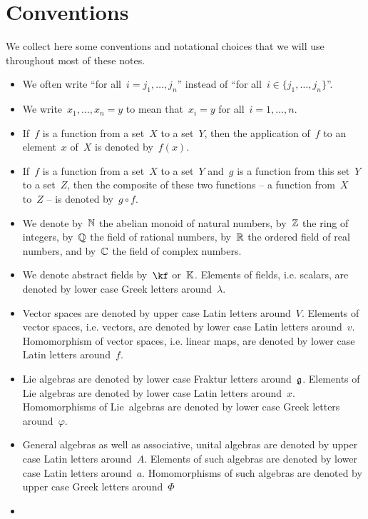 \chapter{Conventions}

We collect here some conventions and notational choices that we will use throughout most of these notes.

\begin{itemize}
	\item
		We often write \enquote{for all~$i = j_1, \dotsc, j_n$} instead of \enquote{for all~$i \in \{ j_1, \dotsc, j_n \}$}.
	\item
		We write~$x_1, \dotsc, x_n = y$ to mean that~$x_i = y$ for all~$i = 1, \dotsc, n$.
	\item
		If~$f$ is a function from a set~$X$ to a set~$Y$, then the application of~$f$ to an element~$x$ of~$X$ is denoted by~$f(x)$.
	\item
		If~$f$ is a function from a set~$X$ to a set~$Y$ and~$g$ is a function from this set~$Y$ to a set~$Z$, then the composite of these two functions -- a function from~$X$ to~$Z$ -- is denoted by~$g \circ f$.
	\item
		We denote by~$\mathbb{N}$ the abelian monoid of natural numbers, by~$\mathbb{Z}$ the ring of integers, by~$\mathbb{Q}$ the field of rational numbers, by~$\mathbb{R}$ the ordered field of real numbers, and by~$\mathbb{C}$ the field of complex numbers.
	\item
		We denote abstract fields by~$\kf$ or~$\mathbb{K}$.
		Elements of fields, i.e. scalars, are denoted by lower case Greek letters around~$\lambda$.
	\item
		Vector spaces are denoted by upper case Latin letters around~$V$.
		Elements of vector spaces, i.e. vectors, are denoted by lower case Latin letters around~$v$.
		Homomorphism of vector spaces, i.e. linear maps, are denoted by lower case Latin letters around~$f$.
	\item
		Lie algebras are denoted by lower case Fraktur letters around~$\mathfrak{g}$.
		Elements of Lie algebras are denoted by lower case Latin letters around~$x$.
		Homomorphisms of Lie~algebras are denoted by lower case Greek letters around~$\varphi$.
	\item
		General algebras as well as associative, unital algebras are denoted by upper case Latin letters around~$A$.
		Elements of such algebras are denoted by lower case Latin letters around~$a$.
		Homomorphisms of such algebras are denoted by upper case Greek letters around~$\Phi$
	\item

\end{itemize}
